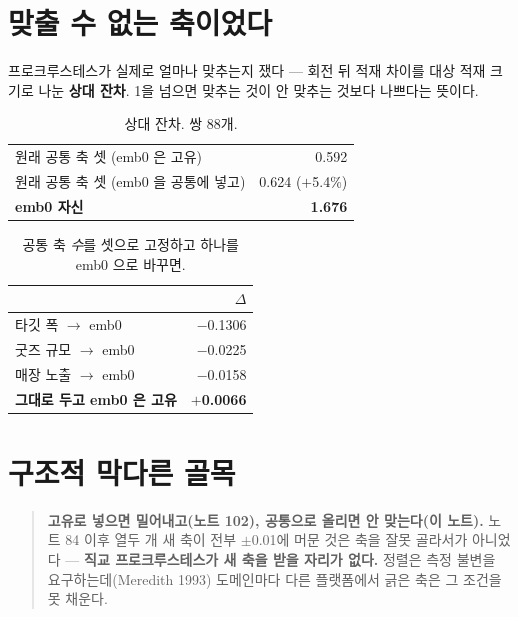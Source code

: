 \documentclass[10pt]{article}
\begin{document}
\section{맞출 수 없는 축이었다}

프로크루스테스가 실제로 얼마나 맞추는지 쟀다 --- 회전 뒤 적재 차이를 대상
적재 크기로 나눈 \textbf{상대 잔차}. 1을 넘으면 맞추는 것이 안 맞추는 것보다
나쁘다는 뜻이다.

\begin{table}[t]
\centering\tsize
\caption{상대 잔차. 쌍 88개.}
\begin{tabular}{lr}
\toprule
원래 공통 축 셋 (emb0 은 고유) & 0.592 \\
원래 공통 축 셋 (emb0 을 공통에 넣고) & 0.624 \quad($+$5.4\%) \\
\textbf{emb0 자신} & \textbf{1.676} \\
\bottomrule
\end{tabular}
\end{table}


\begin{table}[t]
\centering\tsize
\caption{공통 축 \emph{수}를 셋으로 고정하고 하나를 emb0 으로 바꾸면.}
\begin{tabular}{lr}
\toprule
& $\Delta$ \\
\midrule
타깃 폭 $\to$ emb0 & $-$0.1306 \\
굿즈 규모 $\to$ emb0 & $-$0.0225 \\
매장 노출 $\to$ emb0 & $-$0.0158 \\
\midrule
\textbf{그대로 두고 emb0 은 고유} & \textbf{$+$0.0066} \\
\bottomrule
\end{tabular}
\end{table}

\section{구조적 막다른 골목}

\begin{quote}\fontsize{9.5}{11.5}\selectfont
\textbf{고유로 넣으면 밀어내고(노트 102), 공통으로 올리면 안 맞는다(이 노트).}
노트 84 이후 열두 개 새 축이 전부 $\pm$0.01에 머문 것은 축을 잘못 골라서가
아니었다 --- \textbf{직교 프로크루스테스가 새 축을 받을 자리가 없다.} 정렬은
측정 불변을 요구하는데(Meredith 1993) 도메인마다 다른 플랫폼에서 긁은 축은
그 조건을 못 채운다.
\end{quote}
\end{document}
